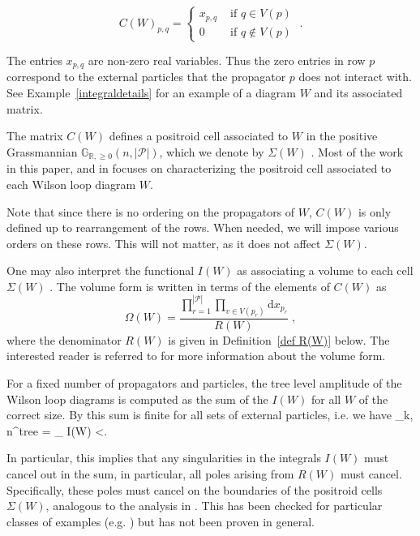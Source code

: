 \documentclass[11pt]{article}
\newcommand{\R}{\mathbb{R}}
\newcommand{\Gr}{\mathbb{G}_{\R, \geq 0}}
\def\bas #1\eas{\begin{align*} #1 \end{align*}}
\newcommand{\cP}{\mathcal{P}}
\theoremstyle{remark}
\theoremstyle{definition}
\begin{document}
\begin{equation} C(W)_{p,q} = \begin{cases} x_{p,q} & \textrm{ if } q \in V(p) \\
0  & \textrm{ if } q \not \in V(p)  \end{cases}
\;. \label{C(W) dfn}\end{equation} 

The entries $x_{p,q}$ are non-zero real variables. Thus the zero entries in row $p$ correspond to the external particles that the propagator $p$ does not interact with. See Example~\ref{integraldetails} for an example of a diagram $W$ and its associated matrix.

The matrix $C(W)$ defines a positroid cell associated to $W$ in the positive Grassmannian $\Gr(n, |\cP|)$, which we denote by $\Sigma(W)$ \cite{wilsonloop}. Most of the work in this paper, and in \cite{generalcombinatoricsI} focuses on characterizing the positroid cell associated to each Wilson loop diagram $W$. 

Note that since there is no ordering on the propagators of $W$, $C(W)$ is only defined up to rearrangement of the rows. When needed, we will impose various orders on these rows. This will not matter, as it does not affect $\Sigma(W)$.

One may also interpret the functional $I(W)$ as associating a volume to each cell $\Sigma(W)$ \cite{wilsonloop, Amplituhedronsquared, HeslopStewart}. The volume form is written in terms of the elements of $C(W)$ as  \begin{equation} \label{eq:omega(W) def}\Omega(W) = \frac{\prod_{r=1}^{|\cP|} \prod_{v \in V(p_r)} \textrm{d}x_{p_r}}{R(W)} \;, \end{equation}
where the denominator $R(W)$ is given in Definition~\ref{def R(W)} below. The interested reader is referred to \cite{Adamo:2012xe,HeslopStewart,LipsteinMason} for more information about the volume form. 

For a fixed number of propagators and particles, the tree level amplitude of the Wilson loop diagrams is computed as the sum of the $I(W)$ for all $W$ of the correct size. By \cite{Adamo:2011pv,Adamo:2012xe,Arkani-Hamed:2013jha} this sum is finite for all sets of external particles, i.e. we have 
\bas \mathcal{A}_{k, n}^{tree} = \sum_{\substack{W = (\cP, [n]), \\ |\cP| = k}} I(W) <\infty. \eas

In particular, this implies that any singularities in the integrals $I(W)$ must cancel out in the sum, in particular, all poles arising from $R(W)$ must cancel. Specifically, these poles must cancel on the boundaries of the positroid cells $\Sigma(W)$, analogous to the analysis in \cite{Arkani-Hamed:2013jha}. This has been checked for particular classes of examples (e.g. \cite{casestudy, Amplituhedronsquared, HeslopStewart}) but has not been proven in general.
\end{document}
